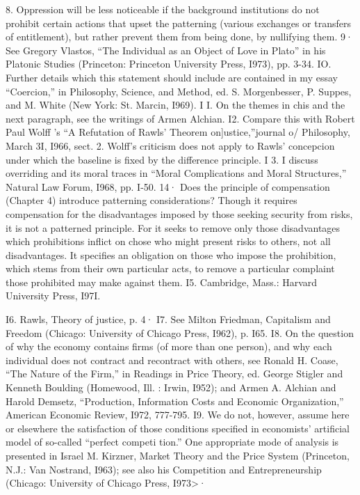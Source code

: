 \documentclass[11pt,openany]{book}
\begin{document}
{8. Oppression will be less noticeable if the background institutions do not prohibit certain actions that upset the patterning (various exchanges or transfers of entitlement), but rather prevent them from being done, by nullifying them. 9· See Gregory Vlastos, ``The Individual as an Object of Love in Plato'' in his Platonic Studies (Princeton: Princeton University Press, I973), pp. 3-34. IO. Further details which this statement should include are contained in my essay ``Coercion,'' in Philosophy, Science, and Method, ed. S. Morgenbesser, P. Suppes, and M. White (New York: St. Marcin, I969). I I. On the themes in chis and the next paragraph, see the writings of Armen Alchian. I2. Compare this with Robert Paul Wolff 's ``A Refutation of Rawls' Theorem on]ustice,''journal o/ Philosophy, March 3I, I966, sect. 2. Wolff's criticism does not apply to Rawls' concepcion under which the baseline is fixed by the difference principle. I 3. I discuss overriding and its moral traces in ``Moral Complications and Moral Structures,'' Natural Law Forum, I968, pp. I-50. 14· Does the principle of compensation (Chapter 4) introduce patterning considerations? Though it requires compensation for the disadvantages imposed by those seeking security from risks, it is not a patterned principle. For it seeks to remove only those disadvantages which prohibitions inflict on chose who might present risks to others, not all disadvantages. It specifies an obligation on those who impose the prohibition, which stems from their own particular acts, to remove a particular complaint those prohibited may make against them. I5. Cambridge, Mass.: Harvard University Press, I97I.\par

I6. Rawls, Theory of justice, p. 4· I7. See Milton Friedman, Capitalism and Freedom (Chicago: University of Chicago Press, I962), p. I65. I8. On the question of why the economy contains firms (of more than one person), and why each individual does not contract and recontract with others, see Ronald H. Coase, ``The Nature of the Firm,'' in Readings in Price Theory, ed. George Stigler and Kenneth Boulding (Homewood, Ill. : Irwin, I952); and Armen A. Alchian and Harold Demsetz, ``Production, Information Costs and Economic Organization,'' American Economic Review, I972, 777-795. I9. We do not, however, assume here or elsewhere the satisfaction of those conditions specified in economists' artificial model of so-called ``perfect competi tion.'' One appropriate mode of analysis is presented in Israel M. Kirzner, Market Theory and the Price System (Princeton, N.J.: Van Nostrand, I963); see also his Competition and Entrepreneurship (Chicago: University of Chicago Press, I973>·\par

}
\end{document}
